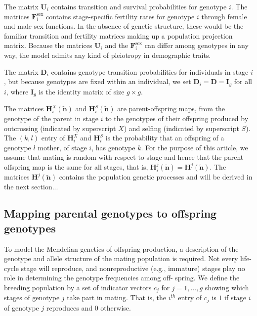 \documentclass[11pt]{article}
\def\mbf#1{\mathbf{#1}}
\begin{document}
\noindent The matrix $\mbf{U}_{i}$ contains transition and survival probabilities for genotype $i$. The matrices $\mbf{F}^{\text{sex}}_{i}$ contains stage-specific fertility rates for genotype $i$ through female and male sex functions. In the absence of genetic structure, these would be the familiar transition and fertility matrices making up a population projection matrix. Because the matrices $\mbf{U}_{i}$ and the $\mbf{F}^{\text{sex}}_{i}$ can differ among genotypes in any way, the model admits any kind of pleiotropy in demographic traits.

The matrix $\mbf{D}_{i}$ contains genotype transition probabilities for individuals in stage $i$, but because genotypes are fixed within an individual, we set $\mbf{D}_{i} = \mbf{D} = \mbf{I}_{g}$ for all $i$, where $\mbf{I}_{g}$ is the identity matrix of size $g \times g$. 

The matrices $\mbf{H}^X_{i}(\tilde{\mbf{n}})$ and $\mbf{H}^S_{i}(\tilde{\mbf{n}})$ are parent-offspring maps, from the genotype of the parent in stage $i$ to the genotypes of their offspring produced by outcrossing (indicated by superscript $X$) and selfing (indicated by superscript $S$). The $(k, l)$ entry of $\mbf{H}^{X}_{i}$ and $\mbf{H}^{S}_{i}$ is the probability that an offspring of a genotype $l$ mother, of stage $i$, has genotype $k$. For the purpose of this article, we assume that mating is random with respect to stage and hence that the parent-offspring map is the same for all stages, that is, $\mbf{H}^j_{i}(\tilde{\mbf{n}}) = \mbf{H}^j(\tilde{\mbf{n}})$. The matrices $\mbf{H}^j(\tilde{\mbf{n}})$ contains the population genetic processes and will be derived in the next section...

\subsection{Mapping parental genotypes to offspring genotypes}

To model the Mendelian genetics of offspring production, a description of the genotype and allele structure of the mating population is required. Not every life-cycle stage will reproduce, and nonreproductive (e.g., immature) stages play no role in determining the genotype frequencies among off- spring. We define the breeding population by a set of indicator vectors $c_j$ for $j = 1, \ldots , g$ showing which stages of genotype $j$ take part in mating. That is, the $i^{th}$ entry of $c_j$ is $1$ if stage $i$ of genotype $j$ reproduces and $0$ otherwise.
\end{document}
